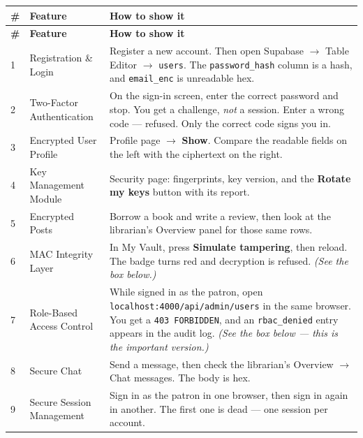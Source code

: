 \documentclass[11pt]{article}
\begin{document}
\renewcommand{\arraystretch}{1.35}
\begin{longtable}{@{}p{0.4cm} p{4.2cm} p{10.3cm}@{}}
\toprule
\textbf{\#} & \textbf{Feature} & \textbf{How to show it} \\
\midrule
\endfirsthead
\toprule
\textbf{\#} & \textbf{Feature} & \textbf{How to show it} \\
\midrule
\endhead

1 & Registration \& Login &
Register a new account. Then open Supabase $\rightarrow$ Table Editor
$\rightarrow$ \texttt{users}. The \texttt{password\_hash} column is a hash, and
\texttt{email\_enc} is unreadable hex. \\

2 & Two-Factor Authentication &
On the sign-in screen, enter the correct password and stop. You get a
challenge, \emph{not} a session. Enter a wrong code --- refused. Only the
correct code signs you in. \\

3 & Encrypted User Profile &
Profile page $\rightarrow$ \textbf{Show}. Compare the readable fields on the
left with the ciphertext on the right. \\

4 & Key Management Module &
Security page: fingerprints, key version, and the \textbf{Rotate my keys}
button with its report. \\

5 & Encrypted Posts &
Borrow a book and write a review, then look at the librarian's Overview panel
for those same rows. \\

6 & MAC Integrity Layer &
In My Vault, press \textbf{Simulate tampering}, then reload. The badge turns
red and decryption is refused. \emph{(See the box below.)} \\

7 & Role-Based Access Control &
While signed in as the patron, open
\texttt{localhost:4000/api/admin/users} in the same browser. You get a
\texttt{403 FORBIDDEN}, and an \texttt{rbac\_denied} entry appears in the audit
log. \emph{(See the box below --- this is the important version.)} \\

8 & Secure Chat &
Send a message, then check the librarian's Overview $\rightarrow$ Chat
messages. The body is hex. \\

9 & Secure Session Management &
Sign in as the patron in one browser, then sign in again in another. The first
one is dead --- one session per account. \\

\bottomrule
\end{longtable}
\end{document}

